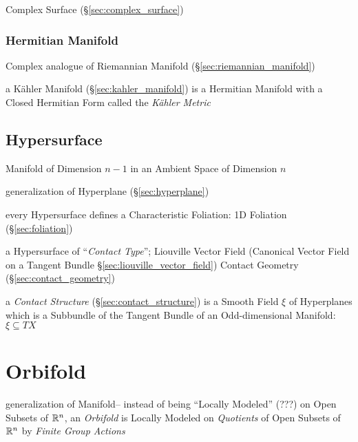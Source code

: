 
Complex Surface (\S\ref{sec:complex_surface})



\subsubsection{Hermitian Manifold}\label{sec:hermitian_manifold}

Complex analogue of Riemannian Manifold (\S\ref{sec:riemannian_manifold})

a K\"ahler Manifold (\S\ref{sec:kahler_manifold}) is a Hermitian
Manifold with a Closed Hermitian Form called the \emph{K\"ahler
  Metric} %



\subsection{Hypersurface}\label{sec:hypersurface}


Manifold of Dimension $n-1$ in an Ambient Space of Dimension $n$

generalization of Hyperplane (\S\ref{sec:hyperplane})

every Hypersurface defines a Characteristic Foliation: 1D Foliation
(\S\ref{sec:foliation})

a Hypersurface of ``\emph{Contact Type}''; Liouville Vector Field (Canonical
Vector Field on a Tangent Bundle \S\ref{sec:liouville_vector_field}) \fist
Contact Geometry (\S\ref{sec:contact_geometry})

a \emph{Contact Structure} (\S\ref{sec:contact_structure}) is a Smooth Field
$\xi$ of Hyperplanes which is a Subbundle of the Tangent Bundle of an
Odd-dimensional Manifold: $\xi \subseteq T X$




\section{Orbifold}\label{sec:orbifold}

generalization of Manifold--
instead of being ``Locally Modeled'' (???) on Open Subsets of $\mathbb{R}^n$, an
\emph{Orbifold} is Locally Modeled on \emph{Quotients} of Open Subsets of
$\mathbb{R}^n$ by \emph{Finite Group Actions}

